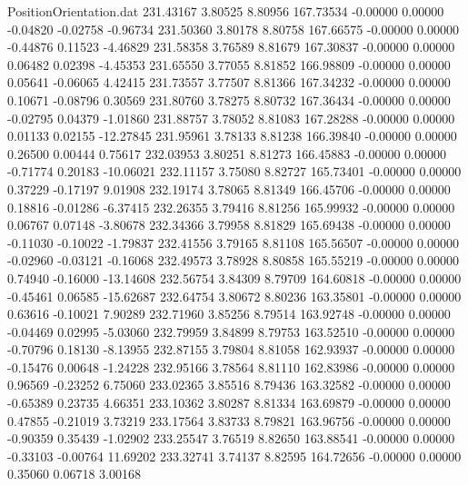 \begin{filecontents}{PositionOrientation.dat}
 231.43167    3.80525    8.80956   167.73534   -0.00000    0.00000   -0.04820   -0.02758   -0.96734
 231.50360    3.80178    8.80758   167.66575   -0.00000    0.00000   -0.44876    0.11523   -4.46829
 231.58358    3.76589    8.81679   167.30837   -0.00000    0.00000    0.06482    0.02398   -4.45353
 231.65550    3.77055    8.81852   166.98809   -0.00000    0.00000    0.05641   -0.06065    4.42415
 231.73557    3.77507    8.81366   167.34232   -0.00000    0.00000    0.10671   -0.08796    0.30569
 231.80760    3.78275    8.80732   167.36434   -0.00000    0.00000   -0.02795    0.04379   -1.01860
 231.88757    3.78052    8.81083   167.28288   -0.00000    0.00000    0.01133    0.02155  -12.27845
 231.95961    3.78133    8.81238   166.39840   -0.00000    0.00000    0.26500    0.00444    0.75617
 232.03953    3.80251    8.81273   166.45883   -0.00000    0.00000   -0.71774    0.20183  -10.06021
 232.11157    3.75080    8.82727   165.73401   -0.00000    0.00000    0.37229   -0.17197    9.01908
 232.19174    3.78065    8.81349   166.45706   -0.00000    0.00000    0.18816   -0.01286   -6.37415
 232.26355    3.79416    8.81256   165.99932   -0.00000    0.00000    0.06767    0.07148   -3.80678
 232.34366    3.79958    8.81829   165.69438   -0.00000    0.00000   -0.11030   -0.10022   -1.79837
 232.41556    3.79165    8.81108   165.56507   -0.00000    0.00000   -0.02960   -0.03121   -0.16068
 232.49573    3.78928    8.80858   165.55219   -0.00000    0.00000    0.74940   -0.16000  -13.14608
 232.56754    3.84309    8.79709   164.60818   -0.00000    0.00000   -0.45461    0.06585  -15.62687
 232.64754    3.80672    8.80236   163.35801   -0.00000    0.00000    0.63616   -0.10021    7.90289
 232.71960    3.85256    8.79514   163.92748   -0.00000    0.00000   -0.04469    0.02995   -5.03060
 232.79959    3.84899    8.79753   163.52510   -0.00000    0.00000   -0.70796    0.18130   -8.13955
 232.87155    3.79804    8.81058   162.93937   -0.00000    0.00000   -0.15476    0.00648   -1.24228
 232.95166    3.78564    8.81110   162.83986   -0.00000    0.00000    0.96569   -0.23252    6.75060
 233.02365    3.85516    8.79436   163.32582   -0.00000    0.00000   -0.65389    0.23735    4.66351
 233.10362    3.80287    8.81334   163.69879   -0.00000    0.00000    0.47855   -0.21019    3.73219
 233.17564    3.83733    8.79821   163.96756   -0.00000    0.00000   -0.90359    0.35439   -1.02902
 233.25547    3.76519    8.82650   163.88541   -0.00000    0.00000   -0.33103   -0.00764   11.69202
 233.32741    3.74137    8.82595   164.72656   -0.00000    0.00000    0.35060    0.06718    3.00168

\end{filecontents}
